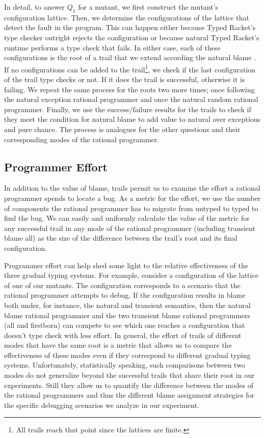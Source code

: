 
In detail, to answer $Q_1$ for a mutant, we first construct the mutant's configuration 
lattice. Then, we determine the configurations of the lattice that detect the fault in the
program. This can happen either because Typed Racket's type checker
outright rejects the configuration or because natural Typed Racket's runtime 
performs a type check that fails. In either
case,  each of these configurations is the root of a trail that we 
extend according the natural blame . 
If no configurations can be added to the trail\footnote{All trails
reach that point since the lattices are finite.}, we check if the
last configuration of the trail type checks or not. If it does the trail
is successful, otherwise it is failing. We repeat the same process for the
roots two more times; once following the natural exception rational programmer and 
once the natural random rational programmer. Finally, we use the
success/failure results for the trails to check if they meet the condition
for natural blame to add value to natural over exceptions and pure chance.
The process is analogues for the other questions and their corresponding
modes of the rational programmer. 


\subsection{Programmer Effort}

In addition to the value of blame, trails permit us to examine the effort a
rational programmer spends to locate a bug. As a metric for the effort, 
we use the number of components the rational programmer has to migrate 
from untyped to typed to find the bug. We can easily and uniformly calculate the value
of the metric for any successful trail in any mode of the rational
programmer (including transient blame all)  as the  size of the difference 
between the trail's root and its final configuration.  

Programmer effort can help shed some light to the relative effectiveness of the
three gradual typing systems. For example, consider a configuration of the
lattice of one of our mutants. The configuration corresponds to a
 scenario that the rational programmer attempts to debug. If the
configuration results in blame both under, for instance, the natural and transient semantics,
then the natural blame rational programmer and the two transient blame
rational programmers (all and firstborn) can compete to see which one
reaches a configuration that doesn't type check with less effort. In
general, the effort of trails of different modes that have the same
root is a metric that allows us to compare the effectiveness of these
modes even if they correspond to different gradual typing systems.
Unfortunately, statistically speaking, such comparisons between two modes do not generalize 
beyond the successful trails that share their root in our experiments.
Still they allow us to quantify the difference between the modes of the rational
programmers and thus the different blame assignment strategies  for the specific
debugging scenarios we analyze in our experiment.
